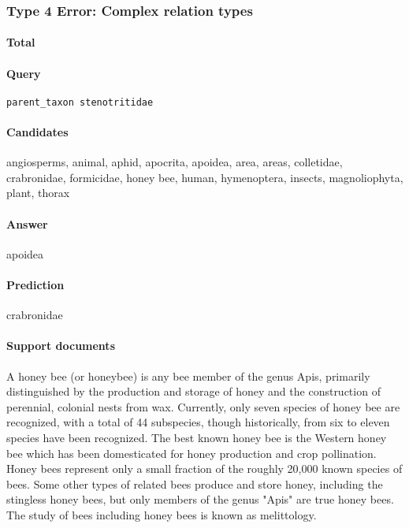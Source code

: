 \documentclass{article} \usepackage{iclr2019_conference,times}
\begin{document}
\subsubsection{Type 4 Error: Complex relation types}

\paragraph{Total}


\paragraph{Query}
\texttt{parent\_taxon stenotritidae}

\paragraph{Candidates}
angiosperms, animal, aphid, apocrita, apoidea, area, areas, colletidae, crabronidae, formicidae, honey bee, human, hymenoptera, insects, magnoliophyta, plant, thorax

\paragraph{Answer} apoidea

\paragraph{Prediction} crabronidae

\paragraph{Support documents}


A honey bee (or honeybee) is any bee member of the genus Apis, primarily distinguished by the production and storage of honey and the construction of perennial, colonial nests from wax. Currently, only seven species of honey bee are recognized, with a total of 44 subspecies, though historically, from six to eleven species have been recognized. The best known honey bee is the Western honey bee which has been domesticated for honey production and crop pollination. Honey bees represent only a small fraction of the roughly 20,000 known species of bees. Some other types of related bees produce and store honey, including the stingless honey bees, but only members of the genus "Apis" are true honey bees. The study of bees including honey bees is known as melittology.
\end{document}
